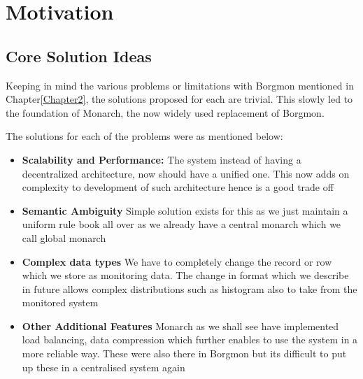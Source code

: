 \chapter{Motivation}

\label{Chapter3} %



\section{Core Solution Ideas}

Keeping in mind the various problems or limitations with Borgmon mentioned in Chapter\ref{Chapter2}, the solutions proposed for each are trivial. This slowly led to the foundation of Monarch, the now widely used replacement of Borgmon.

The solutions for each of the problems were as mentioned below:

\begin{itemize}
    \item \textbf{Scalability and Performance:} The system instead of having a decentralized architecture, now should have a unified one. This now adds on complexity to development of such architecture hence is a good trade off
    
    \item \textbf{Semantic Ambiguity} Simple solution exists for this as we just maintain a uniform rule book all over as we already have a central monarch which we call global monarch
    
    \item \textbf{Complex data types} We have to completely change the record or row which we store as monitoring data. The change in format which we describe in future allows complex distributions such as histogram also to take from the monitored system
    
    \item \textbf{Other Additional Features} Monarch as we shall see have implemented load balancing, data compression which further enables to use the system in a more reliable way. These were also there in Borgmon but its difficult to put up these in a centralised system again
\end{itemize}




